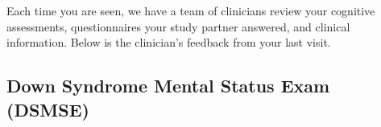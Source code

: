 Each time you are seen, we have a team of clinicians review your cognitive assessments, questionnaires your study partner answered, and clinical information. Below is the clinician’s feedback from your last visit. 

\subsection{Down Syndrome Mental Status Exam (DSMSE)}